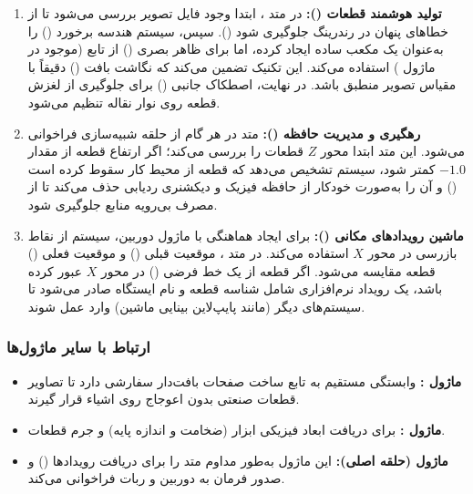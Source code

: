 \documentclass{article}
\begin{document}
\begin{enumerate}
	\item \textbf{تولید هوشمند قطعات ():} در متد ، ابتدا وجود فایل تصویر بررسی می‌شود تا از خطاهای پنهان در رندرینگ جلوگیری شود (). سپس، سیستم هندسه برخورد () را به‌عنوان یک مکعب ساده ایجاد کرده، اما برای ظاهر بصری () از تابع  (موجود در ماژول ) استفاده می‌کند. این تکنیک تضمین می‌کند که نگاشت بافت () دقیقاً با مقیاس تصویر منطبق باشد. در نهایت، اصطکاک جانبی () برای جلوگیری از لغزش قطعه روی نوار نقاله تنظیم می‌شود.
	
	\item \textbf{رهگیری و مدیریت حافظه ():} متد  در هر گام از حلقه شبیه‌سازی فراخوانی می‌شود. این متد ابتدا محور $Z$ قطعات را بررسی می‌کند؛ اگر ارتفاع قطعه از مقدار $-1.0$ کمتر شود، سیستم تشخیص می‌دهد که قطعه از محیط کار سقوط کرده است () و آن را به‌صورت خودکار از حافظه فیزیک و دیکشنری ردیابی حذف می‌کند تا از مصرف بی‌رویه منابع جلوگیری شود.
	
	\item \textbf{ماشین رویدادهای مکانی ():} برای ایجاد هماهنگی با ماژول دوربین، سیستم از نقاط بازرسی در محور $X$ استفاده می‌کند. در متد ، موقعیت قبلی () و موقعیت فعلی () قطعه مقایسه می‌شود. اگر قطعه از یک خط فرضی () در محور $X$ عبور کرده باشد، یک رویداد نرم‌افزاری شامل شناسه قطعه و نام ایستگاه صادر می‌شود تا سیستم‌های دیگر (مانند پایپ‌لاین بینایی ماشین) وارد عمل شوند.
\end{enumerate}

\subsubsection{ارتباط با سایر ماژول‌ها}
\begin{itemize}
	\item \textbf{ماژول :} وابستگی مستقیم به تابع ساخت صفحات بافت‌دار سفارشی دارد تا تصاویر قطعات صنعتی بدون اعوجاج روی اشیاء قرار گیرند.
	\item \textbf{ماژول :} برای دریافت ابعاد فیزیکی ابزار (ضخامت و اندازه پایه) و جرم قطعات.
	\item \textbf{ماژول  (حلقه اصلی):} این ماژول به‌طور مداوم متد  را برای دریافت رویدادها () و صدور فرمان به دوربین و ربات فراخوانی می‌کند.
\end{itemize}
\end{document}
